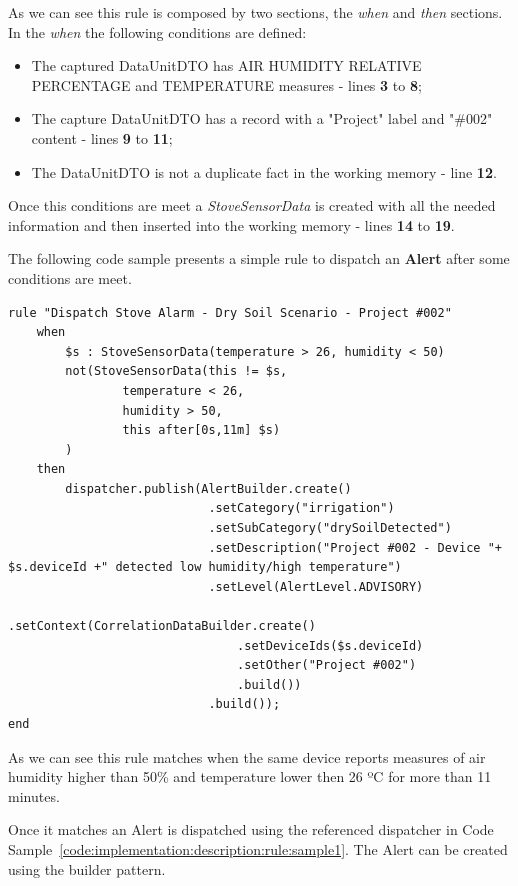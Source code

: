 As we can see this rule is composed by two sections, the \textit{when} and \textit{then} sections. In the \textit{when} the following conditions are defined:

\begin{itemize}
    \item The captured DataUnitDTO has AIR HUMIDITY RELATIVE PERCENTAGE and TEMPERATURE measures - lines \textbf{3} to \textbf{8};
    \item The capture DataUnitDTO has a record with a "Project" label and "\#002" content - lines \textbf{9} to \textbf{11};
    \item The DataUnitDTO is not a duplicate fact in the working memory - line \textbf{12}.
\end{itemize}

Once this conditions are meet a \textit{StoveSensorData} is created with all the needed information and then inserted into the working memory - lines \textbf{14} to \textbf{19}.

The following code sample presents a simple rule to dispatch an \textbf{Alert} after some conditions are meet. 

\begin{lstlisting}[style=drools, caption=Rule Scenario Example - Part 3, label={code:implementation:description:rule:sample3}]
rule "Dispatch Stove Alarm - Dry Soil Scenario - Project #002"
    when
        $s : StoveSensorData(temperature > 26, humidity < 50)
        not(StoveSensorData(this != $s,
                temperature < 26,
                humidity > 50,
                this after[0s,11m] $s)
        )
    then 
        dispatcher.publish(AlertBuilder.create()
                            .setCategory("irrigation")
                            .setSubCategory("drySoilDetected")
                            .setDescription("Project #002 - Device "+ $s.deviceId +" detected low humidity/high temperature")
                            .setLevel(AlertLevel.ADVISORY)
                            .setContext(CorrelationDataBuilder.create()
                                .setDeviceIds($s.deviceId)
                                .setOther("Project #002")
                                .build())
                            .build());
end
\end{lstlisting}

As we can see this rule matches when the same device reports measures of air humidity higher than 50\% and temperature lower then 26 ºC for more than 11 minutes.

Once it matches an Alert is dispatched using the referenced dispatcher in Code Sample~\ref{code:implementation:description:rule:sample1}. The Alert can be created using the builder pattern.


